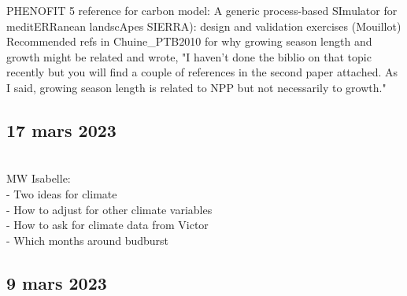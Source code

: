\documentclass[11pt,letter]{article}
\begin{document}
PHENOFIT 5 reference for carbon model: A generic process-based SImulator for meditERRanean landscApes SIERRA): design and validation exercises (Mouillot)\\

Recommended refs in Chuine\_PTB2010 for why growing season length and growth might be related and wrote, "I haven’t done the biblio on that topic recently but you will find a couple of references in the second paper attached. As I said, growing season length is related to NPP but not necessarily to growth."

\subsection{17 mars 2023}\\

MW Isabelle:\\
- Two ideas for climate\\
- How to adjust for other climate variables\\
- How to ask for climate data from Victor \\
- Which months around budburst \\

\subsection{9 mars 2023}
\end{document}
